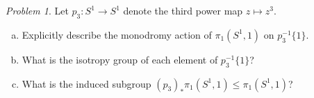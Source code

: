 \documentclass[11pt,twoside]{amsart}
\theoremstyle{plain}
\theoremstyle{remark}
\newtheorem{prob}{Problem}
\theoremstyle{definition}
\theoremstyle{definition}
\begin{document}
\begin{prob}
Let $p_3\colon S^1\to S^1$ denote the third power map $z\mapsto z^3$.
\begin{enumerate}[(a)]
\item Explicitly describe the monodromy action of $\pi_1(S^1,1)$ on $p_3^{-1}\{1\}$.
\item What is the isotropy group of each element of $p_3^{-1}\{1\}$?
\item What is the induced subgroup $(p_3)_*\pi_1(S^1,1)\le \pi_1(S^1,1)$?
\end{enumerate}
\end{prob}
\end{document}
